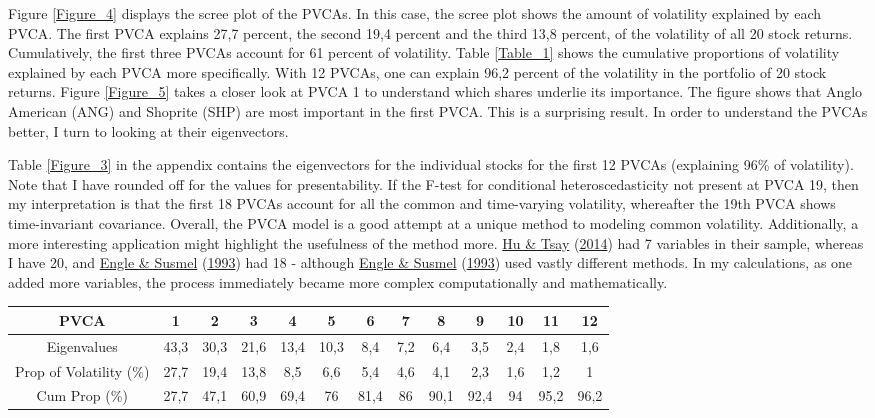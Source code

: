 \documentclass[11pt,preprint, authoryear]{elsarticle}
\let\origtable\table
\let\endorigtable\endtable
\renewenvironment{table}[1][2] {
    \expandafter\origtable\expandafter[H]
} {
    \endorigtable
}
\numberwithin{equation}{section}
\numberwithin{figure}{section}
\numberwithin{table}{section}
\begin{document}
Figure \ref{Figure_4} displays the scree plot of the PVCAs. In this
case, the scree plot shows the amount of volatility explained by each
PVCA. The first PVCA explains 27,7 percent, the second 19,4 percent and
the third 13,8 percent, of the volatility of all 20 stock returns.
Cumulatively, the first three PVCAs account for 61 percent of
volatility. Table \ref{Table_1} shows the cumulative proportions of
volatility explained by each PVCA more specifically. With 12 PVCAs, one
can explain 96,2 percent of the volatility in the portfolio of 20 stock
returns. Figure \ref{Figure_5} takes a closer look at PVCA 1 to
understand which shares underlie its importance. The figure shows that
Anglo American (ANG) and Shoprite (SHP) are most important in the first
PVCA. This is a surprising result. In order to understand the PVCAs
better, I turn to looking at their eigenvectors.

Table \ref{Figure_3} in the appendix contains the eigenvectors for the
individual stocks for the first 12 PVCAs (explaining 96\% of
volatility). Note that I have rounded off for the values for
presentability. If the F-test for conditional heteroscedasticity not
present at PVCA 19, then my interpretation is that the first 18 PVCAs
account for all the common and time-varying volatility, whereafter the
19th PVCA shows time-invariant covariance. Overall, the PVCA model is a
good attempt at a unique method to modeling common volatility.
Additionally, a more interesting application might highlight the
usefulness of the method more. \protect\hyperlink{ref-hu}{Hu \& Tsay}
(\protect\hyperlink{ref-hu}{2014}) had 7 variables in their sample,
whereas I have 20, and \protect\hyperlink{ref-engle}{Engle \& Susmel}
(\protect\hyperlink{ref-engle}{1993}) had 18 - although
\protect\hyperlink{ref-engle}{Engle \& Susmel}
(\protect\hyperlink{ref-engle}{1993}) used vastly different methods. In
my calculations, as one added more variables, the process immediately
became more complex computationally and mathematically.

\begin{table}[h!]
\centering
\begin{tabular}{|c c c c c c c c c c c c c|}
\hline
PVCA & 1 & 2 & 3 & 4 & 5 & 6 & 7 & 8 & 9 & 10 & 11 & 12 \\
\hline\hline 
Eigenvalues & 43,3 & 30,3 & 21,6 & 13,4 & 10,3 & 8,4 & 7,2 & 6,4 & 3,5 & 2,4 & 1,8 & 1,6 \\
Prop of Volatility (\%) & 27,7 & 19,4 & 13,8 & 8,5 & 6,6 & 5,4 & 4,6 & 4,1 & 2,3 & 1,6 & 1,2 & 1 \\ 
Cum Prop (\%) & 27,7 & 47,1 & 60,9 & 69,4 & 76 & 81,4 & 86 & 90,1 & 92,4 & 94 & 95,2 & 96,2 \\ 
\hline
\end{tabular}
\caption{PVCAs}\label{Table_2}
\end{table}
\end{document}
